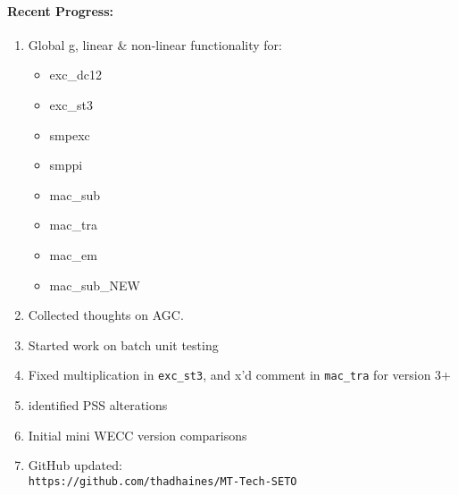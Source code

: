 \documentclass[12pt]{article}
\begin{document}
\begin{multicols}{2}
\raggedright

\paragraph{Recent Progress:}
	\begin{enumerate}
		\itemsep0em 
		\item Global g, linear \& non-linear functionality for:
		\begin{minipage}{\linewidth}
		\begin{multicols}{2}
				\begin{itemize}
		\itemsep0em 
				\footnotesize
					\item exc\_dc12
					\item exc\_st3
					\item smpexc
					\item smppi
					\item mac\_sub
					\item mac\_tra
					\item mac\_em
					\item mac\_sub\_NEW
				\end{itemize}
		\end{multicols}
		\end{minipage}
		\item Collected thoughts on AGC.
		\item Started work on batch unit testing
		\item Fixed multiplication in \verb|exc_st3|, and x'd comment in \verb|mac_tra| for version 3+
		\item identified PSS alterations
		\item Initial mini WECC version comparisons
		\item GitHub updated:\\
	{\footnotesize	\verb|https://github.com/thadhaines/MT-Tech-SETO| }\\
	\end{enumerate}
	


\end{multicols}
\end{document}
